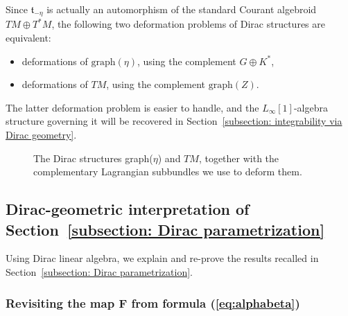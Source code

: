 \documentclass[10pt,a4paper]{amsart}
\numberwithin{equation}{section}
\renewcommand{\t}{\mathfrak{t}}
\begin{document}
\begin{Remark}\label{Rem:twodefproblems}Since $\t_{-\eta}$ is actually an automorphism of the standard Courant algebroid $TM\oplus T^*M$, the following two deformation problems of Dirac structures are equivalent:
 \begin{itemize}\itemsep=0pt
\item deformations of $\mathrm{graph}(\eta)$, using the complement $G\oplus K^*$,
\item deformations of $TM$, using the complement $\mathrm{graph}(Z)$.
\end{itemize}
The latter deformation problem is easier to handle, and the $L_{\infty}[1]$-algebra structure governing it will be recovered in Section~\ref{subsection: integrability via Dirac geometry}.
\end{Remark}

\begin{figure}[h]\centering
{}
\caption{The Dirac structures graph($\eta$) and $TM$, together with the complementary Lagrangian subbundles we use to deform them.}
\end{figure}

\subsection{Dirac-geometric interpretation of Section~\ref{subsection: Dirac parametrization}}\label{subsection: Dirac-geometric interpretation}

Using Dirac linear algebra, we explain and re-prove the results recalled in Section~\ref{subsection: Dirac parametrization}.

\subsubsection[Revisiting the map $F$ from formula (\ref{eq:alphabeta})]{Revisiting the map $\boldsymbol{F}$ from formula (\ref{eq:alphabeta})}
\end{document}
